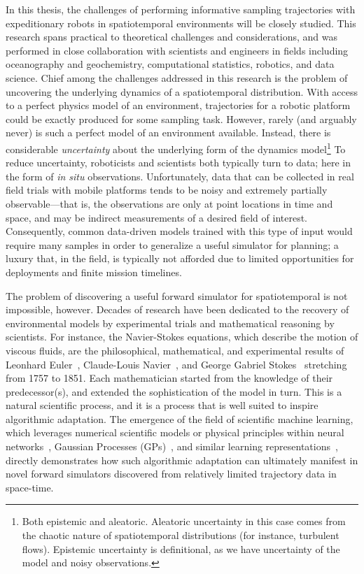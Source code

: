 In this thesis, the challenges of performing informative sampling trajectories with expeditionary robots in spatiotemporal environments will be closely studied. 
This research spans practical to theoretical challenges and considerations, and was performed in close collaboration with scientists and engineers in fields including oceanography and geochemistry, computational statistics, robotics, and data science.
Chief among the challenges addressed in this research is the problem of uncovering the underlying dynamics of a spatiotemporal distribution.
With access to a perfect physics model of an environment, trajectories for a robotic platform could be exactly produced for some sampling task.
However, rarely (and arguably never) is such a perfect model of an environment available.
Instead, there is considerable \emph{uncertainty} about the underlying form of the dynamics model\footnote{Both epistemic and aleatoric. Aleatoric uncertainty in this case comes from the chaotic nature of spatiotemporal distributions (for instance, turbulent flows). Epistemic uncertainty is definitional, as we have uncertainty of the model and noisy observations.}
To reduce uncertainty, roboticists and scientists both typically turn to data; here in the form of \emph{in situ} observations.
Unfortunately, data that can be collected in real field trials with mobile platforms tends to be noisy and extremely partially observable---that is, the observations are only at point locations in time and space, and may be indirect measurements of a desired field of interest. 
Consequently, common data-driven models trained with this type of input would require many samples in order to generalize a useful simulator for planning; a luxury that, in the field, is typically not afforded due to limited opportunities for deployments and finite mission timelines.

The problem of discovering a useful forward simulator for spatiotemporal is not impossible, however.
Decades of research have been dedicated to the recovery of environmental models by experimental trials and mathematical reasoning by scientists.
For instance, the Navier-Stokes equations, which describe the motion of viscous fluids, are the philosophical, mathematical, and experimental results of Leonhard Euler~\autocite{euler1757principes}, Claude-Louis Navier~\autocite{navier1822lois}, and George Gabriel Stokes~\autocite{stokes1851effect} stretching from 1757 to 1851. 
Each mathematician started from the knowledge of their predecessor(s), and extended the sophistication of the model in turn.
This is a natural scientific process, and it is a process that is well suited to inspire algorithmic adaptation.
The emergence of the field of scientific machine learning, which leverages numerical scientific models or physical principles within neural networks~\autocite{raissi2019physics, sapsis2009dynamically, mohan2019compressed}, Gaussian Processes (GPs)~\autocite{raissi2018numerical}, and similar learning representations~\autocite{kulkarni2019advection, brunton2016discovering}, directly demonstrates how such algorithmic adaptation can ultimately manifest in novel forward simulators discovered from relatively limited trajectory data in space-time.


